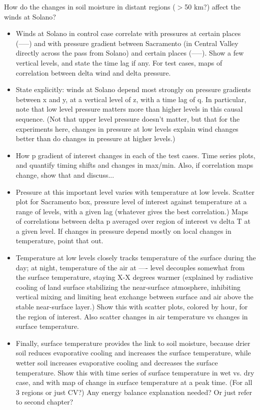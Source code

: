 \documentclass[12pt]{amsart}
\begin{document}
How do the changes in soil moisture in distant regions ($>$50 km?) affect the winds at Solano?
\begin{itemize}
\item Winds at Solano in control case correlate with pressures at certain places (-----) and with pressure gradient between Sacramento (in Central Valley directly across the pass from Solano) and certain places (-----).  Show a few vertical levels, and state the time lag if any.  For test cases, maps of correlation between delta wind and delta pressure.
\item State explicitly: winds at Solano depend most strongly on pressure gradients between x and y, at a vertical level of z, with a time lag of q.  In particular, note that low level pressure matters more than higher levels in this causal sequence. (Not that upper level pressure doesn't matter, but that for the experiments here, changes in pressure at low levels explain wind changes better than do changes in pressure at higher levels.)
\item How p gradient of interest changes in each of the test cases.  Time series plots, and quantify timing shifts and changes in max/min.  Also, if correlation maps change, show that and discuss... 
\item Pressure at this important level varies with temperature at low levels.  Scatter plot for Sacramento box, pressure level of interest against temperature at a range of levels, with a given lag (whatever gives the best correlation.)  Maps of correlations between delta p averaged over region of interest vs delta T at a given level.  If changes in pressure depend mostly on local changes in temperature, point that out.
\item Temperature at low levels closely tracks temperature of the surface during the day; at night, temperature of the air at ---- level decouples somewhat from the surface temperature, staying X-X degrees warmer (explained by radiative cooling of land surface stabilizing the near-surface atmosphere, inhibiting vertical mixing and limiting heat exchange between surface and air above the stable near-surface layer.)  Show this with scatter plots, colored by hour, for the region of interest.  Also scatter changes in air temperature vs changes in surface temperature.
\item Finally, surface temperature provides the link to soil moisture, because drier soil reduces evaporative cooling and increases the surface temperature, while wetter soil increases evaporative cooling and decreases the surface temperature.  Show this with time series of surface temperature in wet vs. dry case, and with map of change in surface temperature at a peak time.  (For all 3 regions or just CV?)  Any energy balance explanation needed?  Or just refer to second chapter?

\end{itemize}
\end{document}

